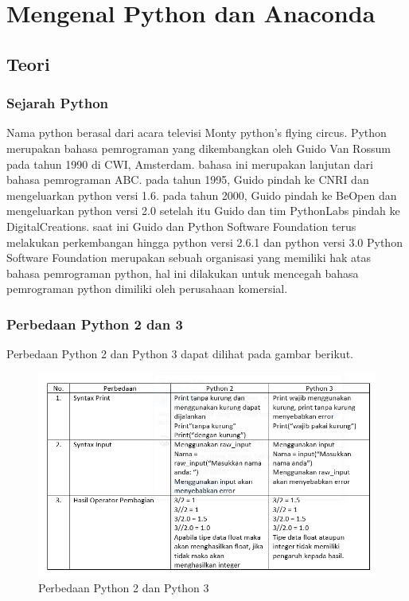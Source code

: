 \chapter{Mengenal Python dan Anaconda}

\section{Teori}
\subsection{Sejarah Python}
Nama python berasal dari acara televisi Monty python's flying circus. Python merupakan bahasa pemrograman yang dikembangkan oleh Guido Van Rossum pada tahun 1990 di CWI, Amsterdam. bahasa ini merupakan lanjutan dari bahasa pemrograman ABC. pada tahun 1995, Guido pindah ke CNRI dan mengeluarkan python versi 1.6. pada tahun 2000, Guido pindah ke BeOpen dan mengeluarkan python versi 2.0 setelah itu Guido dan tim PythonLabs pindah ke  DigitalCreations. saat ini Guido dan Python Software Foundation terus melakukan perkembangan hingga python versi 2.6.1 dan python versi 3.0
Python Software Foundation merupakan sebuah organisasi yang memiliki hak atas bahasa pemrograman python, hal ini dilakukan untuk mencegah bahasa pemrograman python dimiliki oleh perusahaan komersial.
\subsection{Perbedaan Python 2 dan 3}
Perbedaan Python 2 dan Python 3 dapat dilihat pada gambar berikut.
\begin{figure}[H]
        \centerline{\includegraphics[scale=1]{figures/perbedaan}}
        \caption{Perbedaan Python 2 dan Python 3}
		\label{perbedaan}
\end{figure}

